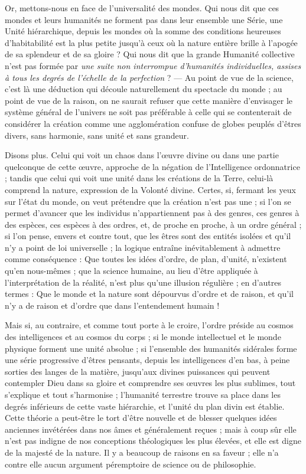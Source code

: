 \documentclass[a4paper, 11pt, oneside, landscape]{article}
\begin{document}
Or, mettons-nous en face de l'universalité des mondes. Qui nous dit que ces mondes et leurs humanités ne forment pas dans leur ensemble une Série, une Unité hiérarchique, depuis les mondes où la somme des conditions heureuses d'habitabilité est la plus petite jusqu'à ceux où la nature entière brille à l'apogée de sa splendeur et de sa gloire ? Qui nous dit que la grande Humanité collective n'est pas formée par \emph{une suite non interrompue d'humanités individuelles, assises à tous les degrés de l'échelle de la perfection} ? --- Au point de vue de la science, c'est là une déduction qui découle naturellement du spectacle du monde ; au point de vue de la raison, on ne saurait refuser que cette manière d'envisager le système général de l'univers ne soit pas préférable à celle qui se contenterait de considérer la création comme une agglomération confuse de globes peuplés d'êtres divers, sans harmonie, sans unité et sans grandeur.

Disons plus. Celui qui voit un chaos dans l'œuvre divine ou dans une partie quelconque de cette œuvre, approche de la négation de l'Intelligence ordonnatrice ; tandis que celui qui voit une unité dans les créations de la Terre, celui-là comprend la nature, expression de la Volonté divine. Certes, si, fermant les yeux sur l'état du monde, on veut prétendre que la création n'est pas une ; si l'on se permet d'avancer que les individus n'appartiennent pas à des genres, ces genres à des espèces, ces espèces à des ordres, et, de proche en proche, à un ordre général ; si l'on pense, envers et contre tout, que les êtres sont des entités isolées et qu'il n'y a point de loi universelle ; la logique entraîne inévitablement à admettre comme conséquence : Que toutes les idées d'ordre, de plan, d'unité, n'existent qu'en nous-mêmes ; que la science humaine, au lieu d'être appliquée à l'interprétation de la réalité, n'est plus qu'une illusion régulière ; en d'autres termes : Que le monde et la nature sont dépourvus d'ordre et de raison, et qu'il n'y a de raison et d'ordre que dans l'entendement humain !

Mais si, au contraire, et comme tout porte à le croire, l'ordre préside au cosmos des intelligences et au cosmos du corps ; si le monde intellectuel et le monde physique forment une unité absolue ; si l'ensemble des humanités sidérales forme une série progressive d'êtres pensants, depuis les intelligences d'en bas, à peine sorties des langes de la matière, jusqu'aux divines puissances qui peuvent contempler Dieu dans sa gloire et comprendre ses œuvres les plus sublimes, tout s'explique et tout s'harmonise ; l'humanité terrestre trouve sa place dans les degrés inférieurs de cette vaste hiérarchie, et l'unité du plan divin est établie. Cette théorie a peut-être le tort d'être nouvelle et de blesser quelques idées anciennes invétérées dans nos âmes et généralement reçues ; mais à coup sûr elle n'est pas indigne de nos conceptions théologiques les plus élevées, et elle est digne de la majesté de la nature. Il y a beaucoup de raisons en sa faveur ; elle n'a contre elle aucun argument péremptoire de science ou de philosophie.
\end{document}

